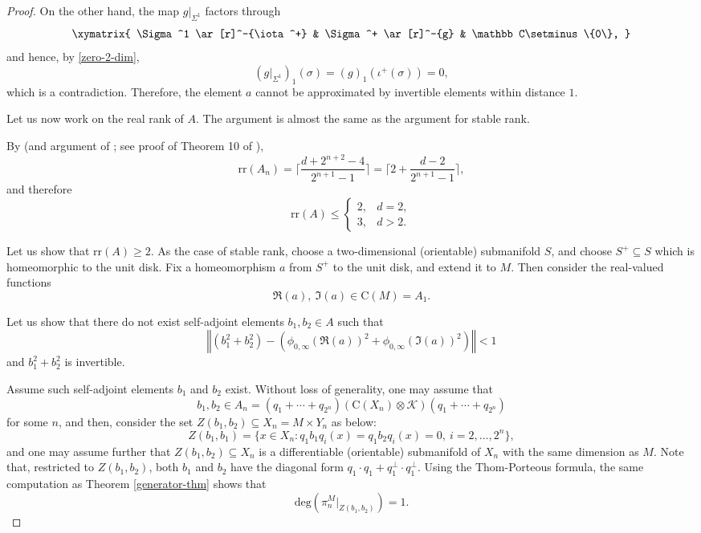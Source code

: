 \documentclass[12pt, oneside, psamsfonts]{amsart}
\theoremstyle{definition}
\theoremstyle{remark}
\numberwithin{equation}{section}
\newcommand{\norm}[1]{\left\Vert#1\right\Vert}
\newcommand{\Comp}{\mathbb C}
\begin{document}
\begin{proof}
On the other hand, the map $g|_{\Sigma^1}$ factors through
$$\xymatrix{
\Sigma^1 \ar[r]^-{\iota^+} & \Sigma^+ \ar[r]^-{g} & \Comp\setminus\{0\},
}
$$
and hence, by \eqref{zero-2-dim},
$$ (g|_{\Sigma^1})_1(\sigma) = (g)_1(\iota^+(\sigma)) = 0,$$
which is a contradiction. Therefore, the element $a$ cannot be approximated by invertible elements within distance $1$. 

 Let us now work on the real rank of $A$. The argument is almost the same as the argument for stable rank.

By \cite{BE-rr} (and argument of \cite{Nistor-tsr}; see proof of Theorem 10 of \cite{Vill-sr}), 
$$\mathrm{rr}(A_n) = \lceil \frac{ d+ 2^{n+2} - 4}{2^{n+1} - 1} \rceil =  \lceil 2+  \frac{ d - 2}{2^{n+1} - 1} \rceil, $$
and therefore
$$ \mathrm{rr}(A) \leq \left\{ 
\begin{array}{ll}
2, & d = 2, \\
3, & d > 2.
\end{array}
\right.$$


Let us show that $\mathrm{rr}(A) \geq 2$. As the case of stable rank, choose a two-dimensional (orientable) submanifold $S$, and choose $S^+ \subseteq S$ which is homeomorphic to the unit disk. Fix a homeomorphism $a$ from $S^+$ to the unit disk, and extend it to $M$. Then consider the real-valued functions 
$$ \Re(a), \ \Im(a) \in \mathrm{C}(M) = A_1. $$  

Let us show that there do not exist self-adjoint elements $b_1, b_2 \in A$ such that 
\begin{equation}\label{perturb-in-rr-0}
 \norm{(b_1^2 + b_2^2) - (\phi_{0, \infty}(\Re(a))^2 + \phi_{0, \infty}(\Im(a))^2)} < 1
\end{equation} 
and $b_1^2 + b_2^2$ is invertible. 

Assume such self-adjoint elements $b_1$ and $b_2$ exist. Without loss of generality, one may assume that $$b_1, b_2 \in A_n = (q_1+\cdots + q_{2^n}) (\mathrm{C}(X_n)\otimes \mathcal K) (q_1+\cdots + q_{2^n})$$ for some $n$, and then, consider the set $Z(b_1, b_2) \subseteq X_n=M \times Y_n$ as below:
$$Z(b_1, b_1) = \{x \in X_n: q_1b_1q_i(x) = q_1b_2q_i(x) = 0,\ i=2, ..., 2^n\},$$ and one may assume further that $Z(b_1, b_2) \subseteq X_n$ is a differentiable (orientable) submanifold of $X_{n}$ with the same dimension as $M$. Note that, restricted to $Z(b_1, b_2)$, both $b_1$ and $b_2$ have the diagonal form $q_1 \cdot q_1 + q_1^\perp \cdot q_1^\perp$.
Using the Thom-Porteous formula, the same computation as Theorem \ref{generator-thm} shows that
$$\mathrm{deg}(\pi_n^M|_{Z(b_1, b_2)}) = 1.$$



\end{proof}
\end{document}
